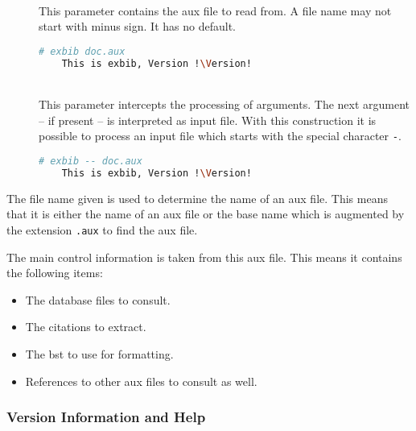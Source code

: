 \begin{description}
\item[]\ \\
  This parameter contains the aux file to read from. A file name may not
  start with minus sign. It has no default.
  \begin{lstlisting}[language=sh,escapechar=!]
    # exbib doc.aux
    This is exbib, Version !\Version!
  \end{lstlisting}
  
\item[\CLi{} ]
\item[\CLI{} ]\ \\
  This parameter intercepts the processing of arguments. The next
  argument -- if present -- is interpreted as input file. With this
  construction it is possible to process an input file which starts
  with the special character \verb|-|.
  \begin{lstlisting}[language=sh,escapechar=!]
    # exbib -- doc.aux
    This is exbib, Version !\Version!
  \end{lstlisting}

\end{description}

The file name given is used to determine the name of an aux file. This
means that it is either the name of an aux file or the base name which
is augmented by the extension \texttt{.aux} to find the aux file.

The main control information is taken from this aux file. This means
it contains the following items:

\begin{itemize}
\item The database files to consult.
\item The citations to extract.
\item The bst to use for formatting.
\item References to other aux files to consult as well.
\end{itemize}

\subsubsection{Version Information and Help}

